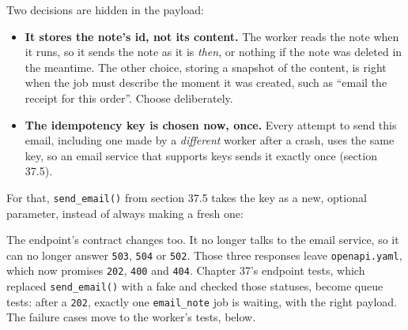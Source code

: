 \noindent{}Two decisions are hidden in the payload:

\begin{itemize}
\tightlist
\item
  \textbf{It stores the note's id, not its content.} The worker reads the note when it runs, so it sends the note as it is \emph{then}, or nothing if the note was deleted in the meantime. The other choice, storing a snapshot of the content, is right when the job must describe the moment it was created, such as ``email the receipt for this order''. Choose deliberately.
\item
  \textbf{The idempotency key is chosen now, once.} Every attempt to send this email, including one made by a \emph{different} worker after a crash, uses the same key, so an email service that supports keys sends it exactly once (section 37.5).
\end{itemize}

\noindent{}For that, \texttt{send\_email()} from section 37.5 takes the key as a new, optional parameter, instead of always making a fresh one:

\begin{codebox}[short]

\begin{Shaded}
\begin{Highlighting}[]
 \OperatorTok{|}  \OperatorTok{=} 
\NormalTok{) }\OperatorTok{{-}\textgreater{}} \NormalTok{:}
\OperatorTok{=}\NormalTok{ \{} 
\end{Highlighting}
\end{Shaded}

\end{codebox}

\noindent{}The endpoint's contract changes too. It no longer talks to the email service, so it can no longer answer \texttt{503}, \texttt{504} or \texttt{502}. Those three responses leave \texttt{openapi.yaml}, which now promises \texttt{202}, \texttt{400} and \texttt{404}. Chapter 37's endpoint tests, which replaced \texttt{send\_email()} with a fake and checked those statuses, become queue tests: after a \texttt{202}, exactly one \texttt{email\_note} job is waiting, with the right payload. The failure cases move to the worker's tests, below.

